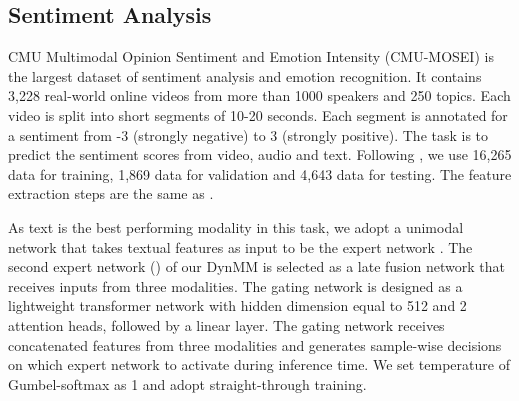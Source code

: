 \subsection{Sentiment Analysis}
CMU Multimodal Opinion Sentiment and Emotion Intensity (CMU-MOSEI) is the largest dataset of sentiment analysis and emotion recognition. It contains 3,228 real-world online videos from more than 1000 speakers and 250 topics.  Each video is split into short segments of 10-20 seconds. Each segment is annotated for a sentiment from -3 (strongly negative) to 3 (strongly positive). The task is to predict the sentiment scores from video, audio and text. Following \cite{multibench}, we use 16,265 data for training, 1,869 data for validation and 4,643 data for testing. The feature extraction steps are the same as \cite{multibench}. 



As text is the best performing modality in this task, we adopt a unimodal network that takes textual features as input to be the expert network . The second expert network () of our DynMM is selected as a late fusion network \cite{multibench} that receives inputs from three modalities. The gating network is designed as a lightweight transformer network with hidden dimension equal to 512 and 2 attention heads, followed by a linear layer. The gating network receives concatenated features from three modalities and generates sample-wise decisions on which expert network to activate during inference time. We set temperature of Gumbel-softmax as 1 and adopt straight-through training.

\begin{table}[!tb]
\centering
{}
\caption{Results on CMU-MOSEI Sentiment Analysis. Modalities V, A, T represent video, audio and text, respectively. Acc denotes binary accuracy (\ie, positive/negative sentiments) and MAE represents mean absolute error. MAdds are measured with a video-audio-text tuple. Each DynMM variant is obtained using a different value of the regularization hyperparameter  during training.}
\label{tab.mosei}
\end{table}

